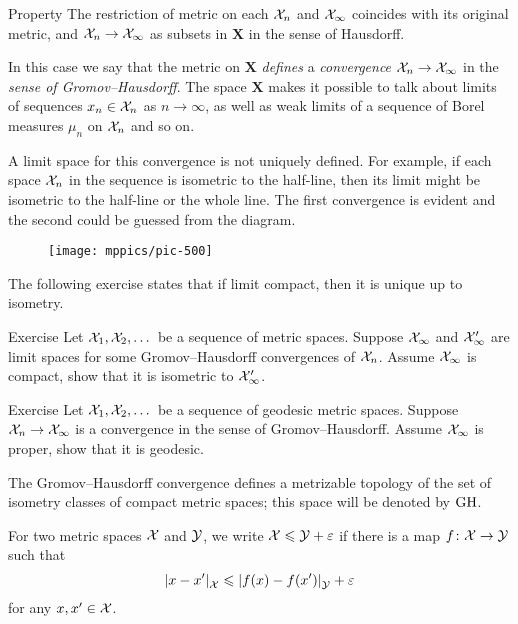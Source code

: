 \begin{thm}{Property}\label{propery:GH}
The restriction of metric on each $\mathcal{X}_n$ and $\mathcal{X}_\infty$ coincides with its original metric, 
and $\mathcal{X}_n\to \mathcal{X}_\infty$ as subsets in $\bm{X}$ in the sense of Hausdorff.
\end{thm}

In this case we say that the metric on $\bm{X}$ \textit{defines} a \emph{convergence} $\spc{X}_n\z\to \spc{X}_\infty$ in the {}\emph{sense of Gromov--Hausdorff}.
The space $\bm{X}$ makes it possible to talk about limits of sequences $x_n\in \mathcal{X}_n$ as $n\to\infty$, as well as weak limits of a sequence of Borel measures $\mu_n$ on $\mathcal{X}_n$ and so on.

A limit space for this convergence is not uniquely defined.
For example, if each space $\mathcal{X}_n$ in the sequence is isometric to the half-line, then its limit might be isometric to the half-line or the whole line.
The first convergence is evident and the second could be guessed from the diagram.

\begin{figure}[ht!]
\vskip-0mm
\centering
\texttt{[image: mppics/pic-500]}
\end{figure}

The following exercise states that if limit compact, then it is unique up to isometry. 

\begin{thm}{Exercise}\label{ex:geod-closed}
Let $\mathcal{X}_1,\mathcal{X}_2,\dots$ be a sequence of metric spaces.
Suppose $\mathcal{X}_\infty$ and $\mathcal{X}_\infty'$ are limit spaces for some Gromov--Hausdorff convergences of $\mathcal{X}_n$.
Assume $\mathcal{X}_\infty$ is compact, show that it is isometric to $\mathcal{X}_\infty'$.
\end{thm}

\begin{thm}{Exercise}\label{ex:geod-closed}
Let $\mathcal{X}_1,\mathcal{X}_2,\dots$ be a sequence of geodesic metric spaces.
Suppose $\mathcal{X}_n\to \mathcal{X}_\infty$ is a convergence in the sense of Gromov--Hausdorff.
Assume $\mathcal{X}_\infty$ is proper, show that it is geodesic.
\end{thm}

The Gromov--Hausdorff convergence defines a metrizable topology of the set of isometry classes of compact metric spaces; this space will be denoted by $\operatorname{\rm GH}\nolimits$.

For two metric spaces $\mathcal{X}$ and $\mathcal{Y}$,
we write $\mathcal{X}\leqslant \mathcal{Y}+\varepsilon$ if
there is a map $f\colon\mathcal{X}\to \mathcal{Y}$ such that 
\[\dist{x}{x'}{\spc{X}}\le \dist{f(x)}{f(x')}{\spc{Y}}+\eps\]
for any $x,x'\in \mathcal{X}$.

